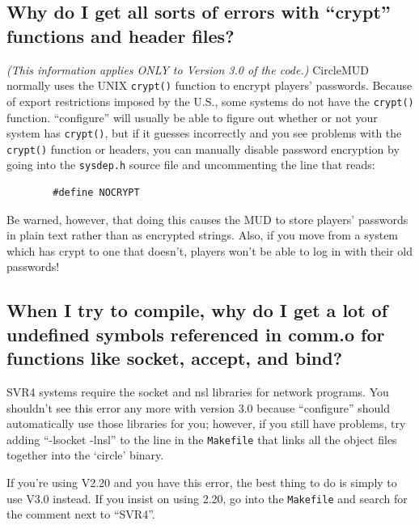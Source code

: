 \documentclass[11pt]{article}
\begin{document}
\subsection{Why do I get all sorts of errors with ``crypt'' functions and header files?}
{\em (This information applies ONLY to Version 3.0 of the code.)} CircleMUD normally uses the UNIX \texttt{crypt()} function to encrypt players' passwords.  Because of export restrictions imposed by the U.S., some systems do not have the \texttt{crypt()} function. ``configure'' will usually be able to figure out whether or not your system has \texttt{crypt()}, but if it guesses incorrectly and you see problems with the \texttt{crypt()} function or headers, you can manually disable password encryption by going into the \texttt{sysdep.h} source
file and uncommenting the line that reads:
\begin{verbatim}
        #define NOCRYPT
\end{verbatim}
Be warned, however, that doing this causes the MUD to store players' passwords in plain text rather than as encrypted strings.  Also, if you move from a system which has crypt to one that doesn't, players won't be able to log in with their old passwords! 

\subsection{When I try to compile, why do I get a lot of undefined symbols referenced in comm.o for functions like socket, accept, and bind?}
SVR4 systems require the socket and nsl libraries for network programs.  You shouldn't see this error any more with version 3.0 because ``configure'' should automatically use those libraries for you; however, if you still have problems, try adding ``-lsocket -lnsl'' to the line in the \texttt{Makefile} that links all the object files together into the `circle' binary. 
\par
If you're using V2.20 and you have this error, the best thing to do is simply to use V3.0 instead.  If you insist on using 2.20, go into the \texttt{Makefile} and search for the comment next to ``SVR4''.
\end{document}
